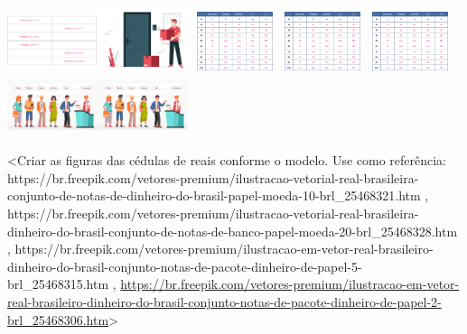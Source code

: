 \begin{escolha}
\begin{escolha}
{{{{\includegraphics[width=1.02736in,height=0.68704in]{media/image110.png}\includegraphics[width=1.09268in,height=0.73073in]{media/image112.png}\includegraphics[width=1.01042in,height=0.67572in]{media/image111.png}\includegraphics[width=1.01042in,height=0.67572in]{media/image111.png}\includegraphics[width=1.01042in,height=0.67572in]{media/image111.png}\includegraphics[width=1.04264in,height=0.69727in]{media/image113.png}\includegraphics[width=1.04264in,height=0.69727in]{media/image113.png}

\textless{}Criar as figuras das cédulas de reais conforme o modelo. Use
como referência:
https://br.freepik.com/vetores-premium/ilustracao-vetorial-real-brasileira-conjunto-de-notas-de-dinheiro-do-brasil-papel-moeda-10-brl\_25468321.htm
,
https://br.freepik.com/vetores-premium/ilustracao-vetorial-real-brasileira-dinheiro-do-brasil-conjunto-de-notas-de-banco-papel-moeda-20-brl\_25468328.htm
,
https://br.freepik.com/vetores-premium/ilustracao-em-vetor-real-brasileiro-dinheiro-do-brasil-conjunto-notas-de-pacote-dinheiro-de-papel-5-brl\_25468315.htm
,
\url{https://br.freepik.com/vetores-premium/ilustracao-em-vetor-real-brasileiro-dinheiro-do-brasil-conjunto-notas-de-pacote-dinheiro-de-papel-2-brl_25468306.htm}\textgreater{}

}}}}
\end{escolha}
\end{escolha}
